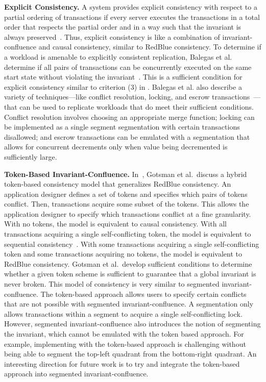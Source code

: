 \textbf{Explicit Consistency.}
A system provides explicit consistency with respect to a partial ordering of
transactions if every server executes the transactions in a total order that
respects the partial order and in a way such that the invariant is always
preserved~\cite{balegas2015towards}. Thus, explicit consistency is like a
combination of invariant-confluence and causal consistency, similar to RedBlue
consistency. To determine if a workload is amenable to explicitly consistent
replication, Balegas et al. determine if all pairs of transactions can be
concurrently executed on the same start state without violating the invariant~\cite{balegas2015towards}.
This is a sufficient condition for explicit consistency similar to criterion
(3) in . Balegas et al. also describe a variety of
techniques---like conflict resolution, locking, and escrow
transactions~\cite{o1986escrow}---that can be used to replicate workloads that
do meet their sufficient conditions. Conflict resolution involves choosing an
appropriate merge function; locking can be implemented as a single segment
segmentation with certain transactions disallowed; and escrow transactions can
be emulated with a segmentation that allows for concurrent decrements only when
value being decremented is sufficiently large.

\textbf{Token-Based Invariant-Confluence.}
In~\cite{gotsman2016cause}, Gotsman et al.\ discuss a hybrid token-based
consistency model that generalizes RedBlue consistency. An application designer
defines a set of tokens and specifies which pairs of tokens conflict. Then,
transactions acquire some subset of the tokens. This allows the application
designer to specify which transactions conflict at a fine granularity. With no
tokens, the model is equivalent to causal consistency. With all transactions
acquiring a single self-conflicting token, the model is equivalent to
sequential consistency~\cite{lamport1979make}. With some transactions acquiring
a single self-conflicting token and some transactions acquiring no tokens, the
model is equivalent to RedBlue consistency. Gotsman et al.\ develop sufficient
conditions to determine whether a given token scheme is sufficient to guarantee
that a global invariant is never broken. This model of consistency is very
similar to segmented invariant-confluence. The token-based approach allows
users to specify certain conflicts that are not possible with segmented
invariant-confluence. A segmentation only allows transactions within a segment
to acquire a single self-conflicting lock. However, segmented
invariant-confluence also introduces the notion of segmenting the invariant,
which cannot be emulated with the token based approach. For example,
implementing  with the token-based approach is
challenging without being able to segment the top-left quadrant from the
bottom-right quadrant. An interesting direction for future work is to try and
integrate the token-based approach into segmented invariant-confluence.

